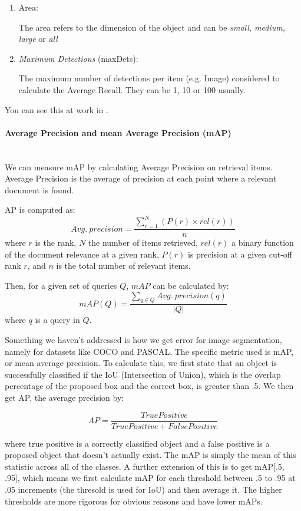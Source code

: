 \begin{enumerate}
	\item Area:
	
	The area refers to the dimension of the object and can be \emph{small, medium, large} or \emph{all}

	\item \emph{Maximum Detections} (maxDets):
	
	The maximum number of detections per item (e.g. Image) considered to calculate the Average Recall. They can be 1, 10 or 100 usually.
	
\end{enumerate}

You can see this at work in .

\paragraph{Average Precision and mean Average Precision (mAP) }
\ \\
We can measure mAP by calculating Average Precision on retrieval items. Average Precision is the average of precision at each point where a relevant document is found.

AP is computed as:
\begin{equation}
Avg. \: precision=\frac{\sum_{r=1}^{N}(P(r)\times rel(r))}{n}
\end{equation}
\noindent
where $ r $ is the rank, $ N $ the number of items retrieved, $ rel(r) $ a binary function of the document relevance at a given rank, $ P(r) $ is precision at a given cut-off rank $ r $, and $ n $ is the total number of relevant items.

Then, for a given set of queries $ Q $, $ mAP $ can be calculated by:
\begin{equation}
mAP(Q)=\frac{\sum_{q\in Q}Avg. \: precision(q)}{|Q|}
\end{equation}
\noindent
where $ q $ is a query in $ Q $.

Something we haven't addressed is how we get error for image segmentation, namely for datasets like COCO and PASCAL. The specific metric used is mAP, or mean average precision. To calculate this, we first state that an object is successfully classified if the IoU (Intersection of Union), which is the overlap percentage of the proposed box and the correct box, is greater than .5. We then get AP, the average precision by:

$$ AP = \frac{True Positive}{True Positive + False Positive} $$

where true positive is a correctly classified object and a false positive is a proposed object that doesn't actually exist. The mAP is simply the mean of this statistic across all of the classes. A further extension of this is to get mAP[.5, .95], which means we first calculate mAP for each threshold between .5 to .95 at .05 increments (the thresold is used for IoU) and then average it. The higher thresholds are more rigorous for obvious reasons and have lower mAPs.

